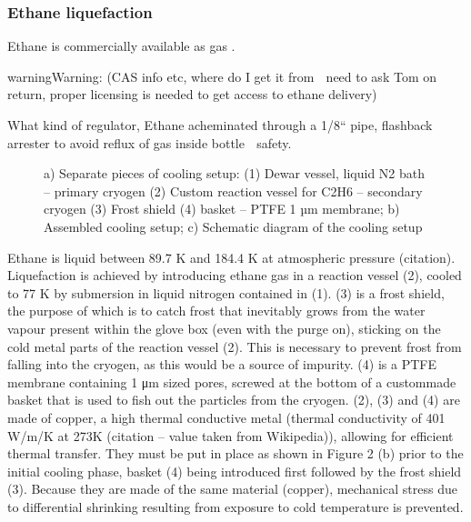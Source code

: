\documentclass[letterpaper,10pt,english]{jupyterBook}
\begin{document}
\subsubsection{Ethane liquefaction}
\label{\detokenize{Chapter6/Chapter6:ethane-liquefaction}}
\sphinxAtStartPar
Ethane is commercially available as gas .

\begin{sphinxadmonition}{warning}{Warning:}
\sphinxAtStartPar
(CAS info etc, where do I get it from  need to ask Tom on return, proper licensing is needed to get access to ethane delivery)
\end{sphinxadmonition}

\sphinxAtStartPar
What kind of regulator, Ethane acheminated through a 1/8“ pipe, flashback arrester to avoid reflux of gas inside bottle  safety.

\begin{figure}[htbp]
\centering
\capstart

\noindent{}
\caption{a) Separate pieces of cooling setup: (1) Dewar vessel, liquid N2 bath – primary cryogen (2) Custom reaction vessel for C2H6 – secondary cryogen (3) Frost shield (4) basket – PTFE 1 µm membrane; b) Assembled cooling setup; c) Schematic diagram of the cooling setup}\label{\detokenize{Chapter6/Chapter6:gb-fig2}}\end{figure}

\sphinxAtStartPar
Ethane is liquid between 89.7 K and 184.4 K at atmospheric pressure (citation). Liquefaction is achieved by introducing ethane gas in a reaction vessel (2), cooled to 77 K by submersion in liquid nitrogen contained in (1). (3) is a frost shield, the purpose of which is to catch frost that inevitably grows from the water vapour present within the glove box (even with the purge on), sticking on the cold metal parts of the reaction vessel (2). This is necessary to prevent frost from falling into the cryogen, as this would be a source of impurity. (4) is a PTFE membrane containing 1 μm sized pores, screwed at the bottom of a custom\sphinxhyphen{}made basket that is used to fish out the particles from the cryogen. (2), (3) and (4) are made of copper, a high thermal conductive metal (thermal conductivity of 401 W/m/K at 273K (citation – value taken from Wikipedia)), allowing for efficient thermal transfer. They must be put in place as shown in Figure 2 (b) prior to the initial cooling phase, basket (4) being introduced first followed by the frost shield (3). Because they are made of the same material (copper), mechanical stress due to differential shrinking resulting from exposure to cold temperature is prevented.
\end{document}
